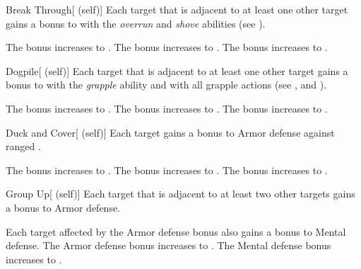         {
            \begin{attuneability}{Break Through}[ (self)]
                Each target that is adjacent to at least one other target
                    gains a  bonus to  with the \textit{overrun} and \textit{shove} abilities (see ).

                \rankline
                 The bonus increases to .
                 The bonus increases to .
                 The bonus increases to .
            \end{attuneability}

            \begin{attuneability}{Dogpile}[ (self)]
                Each target that is adjacent to at least one other target
                gains a  bonus to  with the \textit{grapple} ability and with all grapple actions (see , and ).

                \rankline
                 The bonus increases to .
                 The bonus increases to .
                 The bonus increases to .
            \end{attuneability}

            \begin{attuneability}{Duck and Cover}[ (self)]
                Each target gains a  bonus to Armor defense against ranged .

                \rankline
                 The bonus increases to .
                 The bonus increases to .
                 The bonus increases to .
            \end{attuneability}

            \begin{attuneability}{Group Up}[ (self)]
                Each target that is adjacent to at least two other targets gains a  bonus to Armor defense.

                \rankline
                 Each target affected by the Armor defense bonus also gains a  bonus to Mental defense.
                 The Armor defense bonus increases to .
                 The Mental defense bonus increases to .
            \end{attuneability}

}
